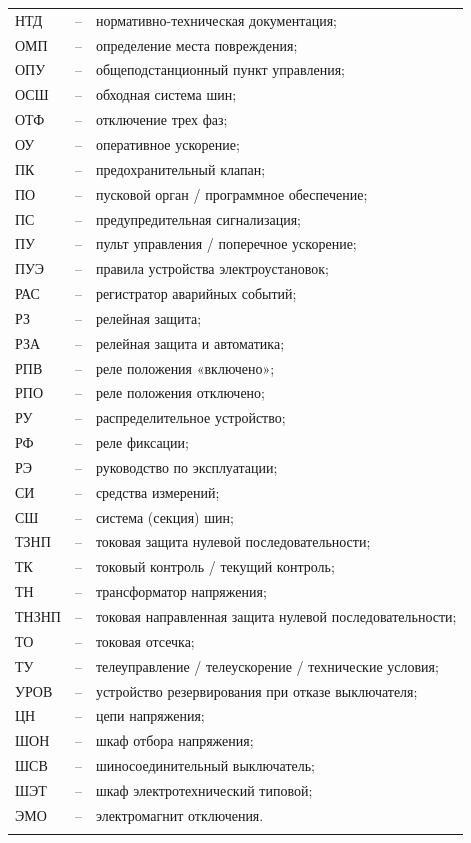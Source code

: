 \begin{longtable}{>{\raggedright\arraybackslash}m{2cm}>{\raggedright\arraybackslash}m{0.5cm}>{\raggedright\arraybackslash}m{20cm}}
НТД & -- & нормативно-техническая документация; \\
ОМП & -- & определение места повреждения; \\
ОПУ & -- & общеподстанционный пункт управления; \\
ОСШ & -- & обходная система шин; \\
ОТФ & -- & отключение трех фаз; \\
ОУ & -- & оперативное ускорение; \\
ПК & -- & предохранительный клапан; \\
ПО & -- & пусковой орган / программное обеспечение; \\
ПС & -- & предупредительная сигнализация; \\
ПУ & -- & пульт управления / поперечное ускорение; \\
ПУЭ & -- & правила устройства электроустановок; \\
РАС & -- & регистратор аварийных событий; \\
РЗ & -- & релейная защита; \\
РЗА & -- & релейная защита и автоматика; \\
РПВ & -- & реле положения «включено»; \\
РПО & -- & реле положения отключено; \\
РУ & -- & распределительное устройство; \\
РФ & -- & реле фиксации; \\
РЭ & -- & руководство по эксплуатации; \\
СИ & -- & средства измерений; \\
СШ & -- & система (секция) шин; \\
ТЗНП & -- & токовая защита нулевой последовательности; \\
ТК & -- & токовый контроль / текущий контроль; \\
ТН & -- & трансформатор напряжения; \\
ТНЗНП & -- & токовая направленная защита нулевой последовательности; \\
ТО & -- & токовая отсечка; \\
ТУ & -- & телеуправление / телеускорение / технические условия; \\
УРОВ & -- & устройство резервирования при отказе выключателя; \\
ЦН & -- & цепи напряжения; \\
ШОН & -- & шкаф отбора напряжения; \\
ШСВ & -- & шиносоединительный выключатель; \\
ШЭТ & -- & шкаф электротехнический типовой; \\
ЭМО & -- & электромагнит отключения. \\
{\color{white}\fontsize{0.1pt}{0.1pt}\selectfont<endABBRS>}
\end{longtable}

